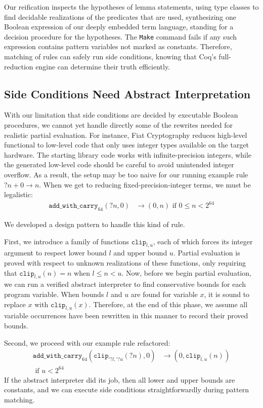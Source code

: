 Our reification inspects the hypotheses of lemma statements, using type classes to find decidable realizations of the predicates that are used, synthesizing one Boolean expression of our deeply embedded term language, standing for a decision procedure for the hypotheses.
The \texttt{Make} command fails if any such expression contains pattern variables not marked as constants.
Therefore, matching of rules can safely run side conditions, knowing that Coq's full-reduction engine can determine their truth efficiently.

\subsection{Side Conditions Need Abstract Interpretation} \label{sec:abs-int}

With our limitation that side conditions are decided by executable Boolean procedures, we cannot yet handle directly some of the rewrites needed for realistic partial evaluation.
For instance, Fiat Cryptography reduces high-level functional to low-level code that only uses integer types available on the target hardware.
The starting library code works with infinite-precision integers, while the generated low-level code should be careful to avoid unintended integer overflow.
As a result, the setup may be too naive for our running example rule $?n + 0 \to n$.
When we get to reducing fixed-precision-integer terms, we must be legalistic:
\begin{align*}
  \texttt{add\_with\_carry}_{64}(?n, 0) & \to (0, n)\text{ if }0 \le n < 2^{64}
\end{align*}

We developed a design pattern to handle this kind of rule.

First, we introduce a family of functions $\texttt{clip}_{l,u}$, each of which forces its integer argument to respect lower bound $l$ and upper bound $u$.
Partial evaluation is proved with respect to unknown realizations of these functions, only requiring that $\texttt{clip}_{l, u}(n) = n$ when $l \leq n < u$.
Now, before we begin partial evaluation, we can run a verified abstract interpreter to find conservative bounds for each program variable.
When bounds $l$ and $u$ are found for variable $x$, it is sound to replace $x$ with $\texttt{clip}_{l,u}(x)$.
Therefore, at the end of this phase, we assume all variable occurrences have been rewritten in this manner to record their proved bounds.

Second, we proceed with our example rule refactored:
\begin{align*}
  \texttt{add\_with\_carry}_{64}(\texttt{clip}_{'?l,'?u}(?n), 0) & \to (0, \texttt{clip}_{l,u}(n)) \\
  \text{ if }u < 2^{64}
\end{align*}
If the abstract interpreter did its job, then all lower and upper bounds are constants, and we can execute side conditions straightforwardly during pattern matching.


